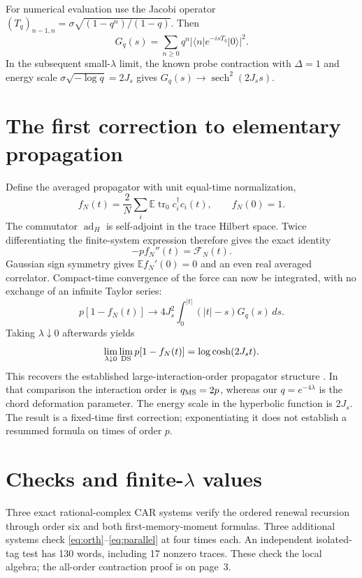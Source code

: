 \documentclass[11pt,a4paper]{article}
\newcommand{\EE}{\mathbb E}
\newcommand{\trz}{\operatorname{tr}_0}
\begin{document}
For numerical evaluation use the Jacobi operator
$(T_q)_{n-1,n}=\sigma\sqrt{(1-q^n)/(1-q)}$. Then
\begin{equation}
 G_q(s)=\sum_{n\geq0}q^n
 |\langle n|e^{-isT_q}|0\rangle|^2.
\end{equation}
In the subsequent small-$\lambda$ limit, the known probe contraction
with $\Delta=1$ and energy scale $\sigma\sqrt{-\log q}=2J_s$ gives
$G_q(s)\to\operatorname{sech}^2(2J_ss)$.

\newpage
\section{The first correction to elementary propagation}
Define the averaged propagator with unit equal-time normalization,
\begin{equation}
 f_N(t)=\frac2N\sum_i\EE\trz c_i^\dagger c_i(t),\qquad f_N(0)=1.
\end{equation}
The commutator $\operatorname{ad}_H$ is self-adjoint in the trace
Hilbert space. Twice differentiating the finite-system expression
therefore gives the exact identity
\begin{equation}
 -p f_N''(t)=\mathcal F_N(t).
\end{equation}
Gaussian sign symmetry gives $\EE f_N'(0)=0$ and an even real
averaged correlator. Compact-time convergence of the force can now
be integrated, with no exchange of an infinite Taylor series:
\begin{equation}\label{eq:fermion}
 p[1-f_N(t)]\longrightarrow
 4J_s^2\int_0^{|t|}(|t|-s)G_q(s)\,ds.
\end{equation}
Taking $\lambda\downarrow0$ afterwards yields
\begin{equation}
 \lim_{\lambda\downarrow0}\lim_{\rm DS}p[1-f_N(t)]
 =\log\cosh(2J_st).
\end{equation}
This recovers the established large-interaction-order propagator
structure \cite{MS}. In that comparison the interaction order is
$q_{\rm MS}=2p$, whereas our $q=e^{-4\lambda}$ is the chord
deformation parameter. The energy scale in the hyperbolic function
is $2J_s$. The result is a fixed-time first correction; exponentiating
it does not establish a resummed formula on times of order $p$.

\section{Checks and finite-$\lambda$ values}
Three exact rational-complex CAR systems verify the ordered renewal
recursion through order six and both first-memory-moment formulas.
Three additional systems check \eqref{eq:orth}--\eqref{eq:parallel}
at four times each. An independent isolated-tag test has 130 words,
including 17 nonzero traces. These check the local algebra; the
all-order contraction proof is on page~3.
\end{document}
